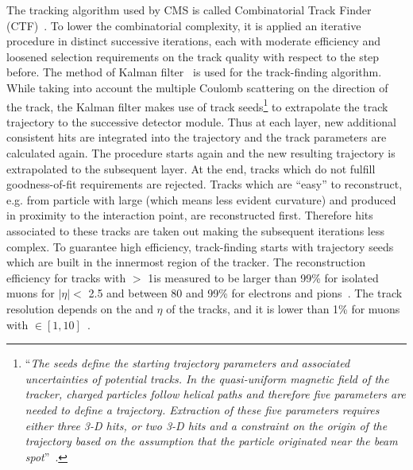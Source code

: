 The tracking algorithm used by CMS is called Combinatorial Track Finder (CTF)~\cite{Collaboration_2014_tracking}.
To lower the combinatorial complexity, it is applied an iterative
procedure in distinct successive iterations, each with moderate
efficiency and loosened selection requirements on the track quality with
respect to the step before. The method of Kalman
filter~\cite{BILLOIR1990219} is used for the track-finding
algorithm. While taking into account the multiple Coulomb scattering on the
direction of the track, the Kalman filter makes use of track
seeds\footnote{``\emph{The seeds define the starting trajectory parameters and associated uncertainties of potential
tracks. In the quasi-uniform magnetic field of the tracker, charged particles follow helical paths
and therefore five parameters are needed to define a trajectory. Extraction of these five parameters
requires either three 3-D hits, or two 3-D hits and a constraint on the origin of the trajectory
based on the assumption that the particle originated near the beam
spot}''~\cite{Collaboration_2014_tracking}.} 
to extrapolate the track
trajectory to the successive detector module. Thus at each layer, new
additional consistent hits
are integrated into the trajectory and the track parameters are
calculated again. The procedure starts again and the new resulting
trajectory is extrapolated to the subsequent layer. At the end, tracks
which do not fulfill goodness-of-fit requirements are rejected. Tracks
which are ``easy'' to reconstruct, e.g. from particle with large \pt
(which means less evident curvature) and produced in proximity to the
interaction point, are reconstructed first. Therefore hits associated
to these tracks are taken out making the subsequent iterations less
complex. To guarantee high efficiency, track-finding starts with
trajectory seeds which are built in the innermost region of the
tracker. 
The reconstruction efficiency for tracks with \pt $>$ 1\GeV  is measured to be larger
than 99\% for isolated muons for $|\eta| < $ 2.5 and between 80 and
99\% for electrons and pions~\cite{CMS:particleflow}. The track \pt
resolution depends on the \pt and $\eta$ of the tracks, and it is
lower than 1\% for muons with \pt $\in [1,10]$\GeV~\cite{CMS:particleflow}.

